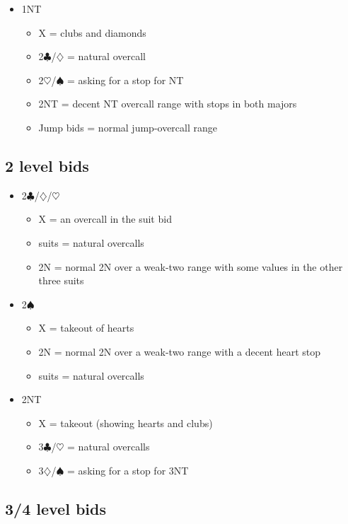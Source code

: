 \begin{itemize}
\item 1NT
	\begin{itemize}
	\item X = clubs and diamonds
	\item 2$\clubsuit$/$\diamondsuit$ = natural overcall
	\item 2$\heartsuit$/$\spadesuit$ = asking for a stop for NT
	\item 2NT = decent NT overcall range with stops in both majors
	\item Jump bids = normal jump-overcall range
	\end{itemize}
\end{itemize}

\subsection{2 level bids}

\begin{itemize}
\item 2$\clubsuit$/$\diamondsuit$/$\heartsuit$
	\begin{itemize}
	\item X = an overcall in the suit bid
	\item suits = natural overcalls
	\item 2N = normal 2N over a weak-two range with some values in the other three suits
	\end{itemize}
\item 2$\spadesuit$
	\begin{itemize}
	\item X = takeout of hearts
	\item 2N = normal 2N over a weak-two range with a decent heart stop
	\item suits = natural overcalls
	\end{itemize}
\item 2NT
	\begin{itemize}
	\item X = takeout (showing hearts and clubs)
	\item 3$\clubsuit$/$\heartsuit$ = natural overcalls
	\item 3$\diamondsuit$/$\spadesuit$ = asking for a stop for 3NT
	\end{itemize}
\end{itemize}

\subsection{3/4 level bids}

